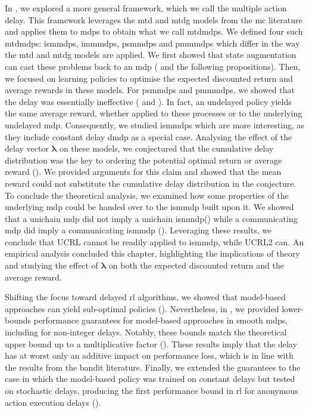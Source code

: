 In , we explored a more general framework, which we call the multiple action delay.
This framework leverages the \gls{mtd} and \gls{mtdg} models from the \gls{mc} literature and applies them to \glspl{mdp} to obtain what we call \glspl{mtdmdp}.
We defined four such \glspl{mtdmdp}: \glspl{ismmdp}, \glspl{immmdp}, \glspl{psmmdp} and \glspl{pmmmdp} which differ in the way the \gls{mtd} and \gls{mtdg} models are applied.
We first showed that state augmentation can cast these problems back to an \gls{mdp} ( and the following propositions).
Then, we focused on learning policies to optimise the expected discounted return and average rewards in these models. 
For \glspl{psmmdp} and \glspl{pmmmdp}, we showed that the delay was essentially ineffective ( and ). 
In fact, an undelayed policy yields the same average reward, whether applied to these processes or to the underlying undelayed \gls{mdp}.
Consequently, we studied \glspl{ismmdp} which are more interesting, as they include constant delay \gls{dmdp} as a special case. 
Analysing the effect of the delay vector $\boldsymbol\lambda$ on these models, we conjectured that the cumulative delay distribution was the key to ordering the potential optimal return or average reward ().  
We provided arguments for this claim and showed that the mean reward could not substitute the cumulative delay distribution in the conjecture.
To conclude the theoretical analysis, we examined how some properties of the underlying \gls{mdp} could be handed over to the \gls{ismmdp} built upon it.
We showed that a unichain \gls{mdp} did not imply a unichain \gls{ismmdp}() while a communicating \gls{mdp} did imply a communicating \gls{ismmdp} ().
Leveraging these results, we conclude that UCRL cannot be readily applied to \gls{ismmdp}, while UCRL2 can.  
An empirical analysis concluded this chapter, highlighting the implications of theory and studying the effect of $\boldsymbol\lambda$ on both the expected discounted return and the average reward. 

Shifting the focus toward delayed \gls{rl} algorithms, we showed that model-based approaches can yield sub-optimal policies ().
Nevertheless, in , we provided lower-bounds performance guarantees for model-based approaches in smooth \glspl{mdp}, including for non-integer delays.
Notably, these bounds match the theoretical upper bound up to a multiplicative factor ().
These results imply that the delay has at worst only an additive impact on performance loss, which is in line with the results from the bandit literature. 
Finally, we extended the guarantees to the case in which the model-based policy was trained on constant delays but tested on stochastic delays, producing the first performance bound in \gls{rl} for anonymous action execution delays ().


